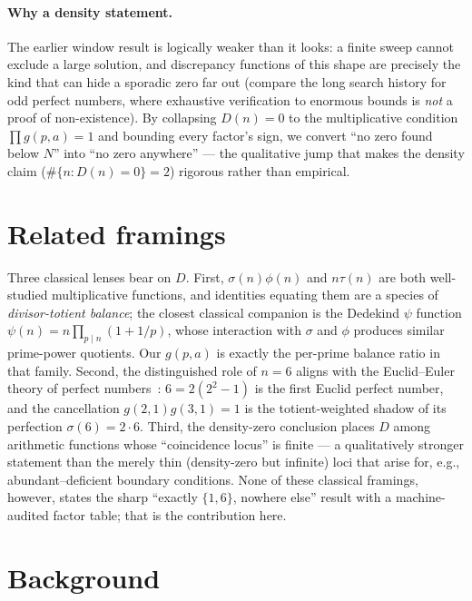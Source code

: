 \documentclass[11pt,a4paper]{article}
\newcommand{\sig}{\sigma}
\theoremstyle{plain}
\theoremstyle{definition}
\begin{document}
\paragraph{Why a density statement.} The earlier window result is logically
weaker than it looks: a finite sweep cannot exclude a large solution, and
discrepancy functions of this shape are precisely the kind that can hide a
sporadic zero far out (compare the long search history for odd perfect numbers,
where exhaustive verification to enormous bounds is \emph{not} a proof of
non-existence). By collapsing $D(n)=0$ to the multiplicative condition
$\prod g(p,a)=1$ and bounding every factor's sign, we convert ``no zero found
below $N$'' into ``no zero anywhere'' --- the qualitative jump that makes the
density claim ($\#\{n:D(n)=0\}=2$) rigorous rather than empirical.

\section{Related framings}
\label{sec:related}

Three classical lenses bear on $D$. First, $\sig(n)\phi(n)$ and $n\tau(n)$ are
both well-studied multiplicative functions, and identities equating them are a
species of \emph{divisor-totient balance}; the closest classical companion is
the Dedekind $\psi$ function $\psi(n)=n\prod_{p\mid n}(1+1/p)$, whose
interaction with $\sig$ and $\phi$ produces similar prime-power quotients. Our
$g(p,a)$ is exactly the per-prime balance ratio in that family. Second, the
distinguished role of $n=6$ aligns with the Euclid--Euler theory of perfect
numbers~\citep{dickson}: $6=2(2^2-1)$ is the first Euclid perfect number, and
the cancellation $g(2,1)g(3,1)=1$ is the totient-weighted shadow of its
perfection $\sig(6)=2\cdot6$. Third, the density-zero conclusion places $D$
among arithmetic functions whose ``coincidence locus'' is finite --- a
qualitatively stronger statement than the merely thin (density-zero but
infinite) loci that arise for, e.g., abundant--deficient boundary conditions.
None of these classical framings, however, states the sharp ``exactly
$\{1,6\}$, nowhere else'' result with a machine-audited factor table; that is
the contribution here.

\section{Background}
\label{sec:background}
\end{document}
